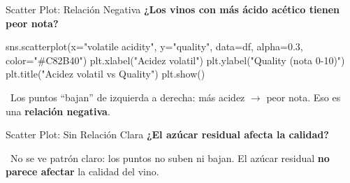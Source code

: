 \documentclass[aspectratio=169, 11pt]{beamer}
\begin{document}
\begin{frame}[fragile,shrink=28]{Scatter Plot: Relación Negativa}
  \vspace{-6pt}
  {\footnotesize\color{arcaDark}\bfseries
    ¿Los vinos con más ácido acético tienen peor nota?}

  \vspace{4pt}
  \begin{pyblock}
sns.scatterplot(x="volatile acidity", y="quality",
                data=df, alpha=0.3, color="#C82B40")
plt.xlabel("Acidez volatil")
plt.ylabel("Quality (nota 0-10)")
plt.title("Acidez volatil vs Quality")
plt.show()
  \end{pyblock}

  \vspace{4pt}
  {\scriptsize\color{textMuted}
    \faLightbulb\ Los puntos ``bajan'' de izquierda a derecha:
    más acidez $\to$ peor nota. Eso es una \textbf{relación negativa}.}
\end{frame}

\begin{frame}[fragile,shrink=28]{Scatter Plot: Sin Relación Clara}
  \vspace{-6pt}
  {\footnotesize\color{arcaDark}\bfseries
    ¿El azúcar residual afecta la calidad?}

  \vspace{4pt}

  \vspace{4pt}
  {\scriptsize\color{textMuted}
    \faLightbulb\ No se ve patrón claro: los puntos no suben ni bajan.
    El azúcar residual \textbf{no parece afectar} la calidad del vino.}
\end{frame}
\end{document}
